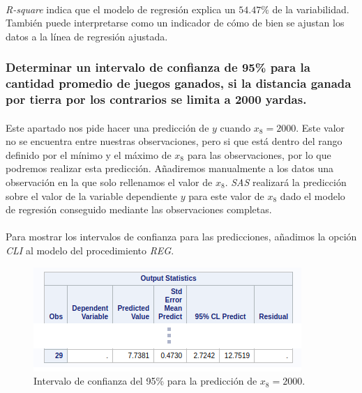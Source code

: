 \documentclass{article}
\begin{document}
  \paragraph{}
  \textit{R-square} indica que el modelo de regresión explica un $54.47\%$ de la variabilidad. También puede interpretarse como un indicador de cómo de bien se ajustan los datos a la línea de regresión ajustada.


  \subsubsection{Determinar un intervalo de confianza de 95\% para la cantidad promedio de juegos ganados, si la distancia ganada por tierra por los contrarios se limita a 2000 yardas.}

  \paragraph{}
  Este apartado nos pide hacer una predicción de $y$ cuando $x_8=2000$. Este valor no se encuentra entre nuestras observaciones, pero si que está dentro del rango definido por el mínimo y el máximo de $x_8$ para las observaciones, por lo que podremos realizar esta predicción. Añadiremos manualmente a los datos una observación en la que solo rellenamos el valor de $x_8$. \textit{SAS} realizará la predicción sobre el valor de la variable dependiente $y$ para este valor de $x_8$ dado el modelo de regresión conseguido mediante las observaciones completas.

  \paragraph{}
  Para mostrar los intervalos de confianza para las predicciones, añadimos la opción \textit{CLI} al modelo del procedimiento \textit{REG}.

  \begin{figure}[H]
    \centering
    \includegraphics[width=.5\linewidth]{img/montgomery/prediccion2000.png}
    \caption{Intervalo de confianza del 95\% para la predicción de $x_8=2000$.}
    \label{img:mont-prediccion2000}
  \end{figure}
\end{document}
